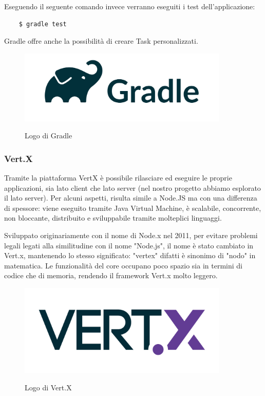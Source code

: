 \noindent Eseguendo il seguente comando invece verranno eseguiti i test dell'applicazione:
\begin{verbatim}
    $ gradle test
\end{verbatim}

Gradle offre anche la possibilità di creare Task personalizzati.
\begin{figure}[H]
    \caption{Logo di Gradle ~\cite{GradleEnterprise:online}}
    \centering
    \includegraphics[width=100mm]{img/logos/gradle_logo.png}
    \label{fig:gradle_logo}
\end{figure}

\subsubsection{Vert.X}
Tramite la piattaforma VertX è possibile rilasciare ed eseguire le proprie applicazioni, sia lato client che lato server (nel nostro progetto abbiamo esplorato il lato server).\newline
Per alcuni aspetti, risulta simile a Node.JS ma con una differenza di spessore: viene eseguito tramite Java Virtual Machine, è scalabile, concorrente, non bloccante, distribuito e sviluppabile tramite molteplici linguaggi.\newline

\noindent Sviluppato originariamente con il nome di Node.x nel 2011, per evitare problemi legali legati alla similitudine con il nome "Node.js", il nome è stato cambiato in Vert.x, mantenendo lo stesso significato: "vertex" difatti è sinonimo di "nodo" in matematica.\newline
Le funzionalità del core occupano poco spazio sia in termini di codice che di memoria, rendendo il framework Vert.x molto leggero.
\begin{figure}[H]
    \caption{Logo di Vert.X ~\cite{VertX:online}}
    \centering
    \includegraphics[width=100mm]{img/logos/vert_x_logo.png}
    \label{fig:vert_x_logo}
\end{figure}


